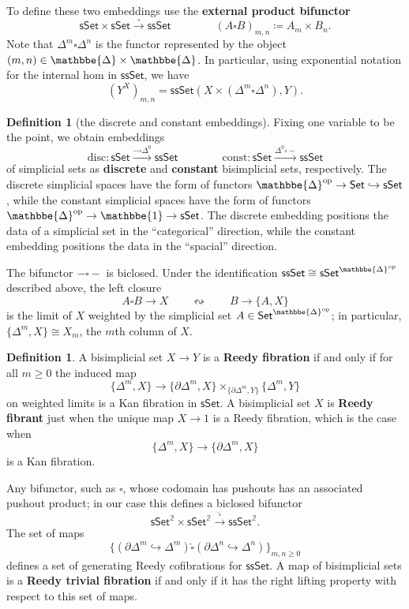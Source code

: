 \documentclass{amsart}
\theoremstyle{plain}
\theoremstyle{definition}
\newtheorem{defn}[thm]{Definition}
\theoremstyle{remark}
\numberwithin{equation}{section}
\newcommand{\defeq}{\coloneqq}
\newcommand{\two}{\mathbb{2}}
\newcommand{\Set}{\mathsf{Set}}
\newcommand{\sSet}{\mathsf{sSet}}
\newcommand{\ssSet}{\mathsf{ssSet}}
\newcommand{\DDelta}{\mathbbe{\Delta}}
\newcommand{\op}{\mathrm{op}}
\begin{document}
To define these two embeddings use the \textbf{external product bifunctor}
\[ \sSet \times \sSet \xrightarrow{\square} \ssSet \qquad \qquad (A \square B)_{m,n} \defeq A_m \times B_n.\]
Note that $\Delta^m \square \Delta^n$ is the functor represented by the object $(m,n) \in \DDelta \times \DDelta$. In particular, using exponential notation for the internal hom in $\ssSet$, we have \[ (Y^X)_{m,n} = \ssSet(X \times (\Delta^m \square \Delta^n), Y).\]

\begin{defn}[the discrete and constant embeddings]
Fixing one variable to be the point, we obtain embeddings
\[ \mathrm{disc} \colon \sSet \xrightarrow{-\square \Delta^0} \ssSet \qquad \qquad \mathrm{const} \colon \sSet \xrightarrow{\Delta^0\square-} \ssSet\] of simplicial sets as \textbf{discrete} and \textbf{constant} bisimplicial sets, respectively. The discrete simplicial spaces have the form of functors $\DDelta^\op \to \Set \hookrightarrow \sSet$, while the constant simplicial spaces have the form of functors $\DDelta^\op \to \mathbbe{1} \to \sSet$. The discrete embedding positions the data of a simplicial set in the ``categorical'' direction, while the constant embedding positions the data in the ``spacial'' direction.
\end{defn}

The bifunctor $-\square -$ is biclosed. Under the identification $\ssSet \cong \sSet^{\DDelta^\op}$ described above, the left closure
\[ A \square B \to X \qquad \leftrightsquigarrow \qquad B \to \{A, X\}\] is the limit of $X$ weighted by the simplicial set $A \in \Set^{\DDelta^\op}$; in particular, $\{\Delta^m,X\} \cong X_m$, the $m$th column of $X$. 


\begin{defn} A bisimplicial set $X \to Y$ is a \textbf{Reedy fibration} if and only if for all $m \geq 0$ the induced map
\[ \{ \Delta^m,X\} \to \{\partial\Delta^m,X\} \times_{\{\partial\Delta^m,Y\}} \{\Delta^m , Y\}\] on weighted limits is a Kan fibration in $\sSet$. A bisimplicial set $X$ is \textbf{Reedy fibrant} just when the unique map $X \to 1$ is a Reedy fibration, which is the case when
\[ \{ \Delta^m, X\} \to \{\partial\Delta^m,X\}\] is a Kan fibration.
\end{defn}

Any bifunctor, such as $\square$, whose codomain has pushouts has an associated pushout product; in our case this defines a biclosed bifunctor
\[  \sSet^\two \times \sSet^\two \xrightarrow{\widehat{\square}} \ssSet^\two.\] The set of maps 
\[ \{ (\partial\Delta^m\hookrightarrow\Delta^m)\mathbin{\widehat{\square}}(\partial\Delta^n\hookrightarrow\Delta^n)\}_{m,n \geq 0}\] defines a set of generating Reedy cofibrations for $\ssSet$. A map of bisimplicial sets is a \textbf{Reedy trivial fibration} if and only if it has the right lifting property with respect to this set of maps.
\end{document}
